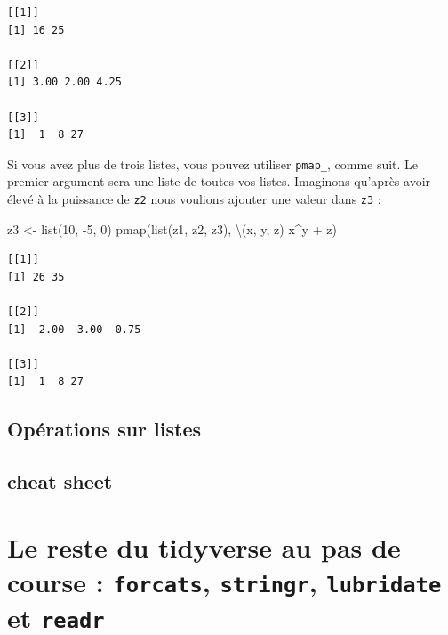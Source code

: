 \documentclass[
  letterpaper,
  DIV=11,
  numbers=noendperiod]{scrreprt}
\newenvironment{Shaded}{\begin{snugshade}}{\end{snugshade}}
\newcommand{\DecValTok}[1]{\textcolor[rgb]{0.68,0.00,0.00}{#1}}
\newcommand{\FunctionTok}[1]{\textcolor[rgb]{0.28,0.35,0.67}{#1}}
\newcommand{\NormalTok}[1]{\textcolor[rgb]{0.00,0.23,0.31}{#1}}
\newcommand{\OtherTok}[1]{\textcolor[rgb]{0.00,0.23,0.31}{#1}}
\newcommand{\SpecialCharTok}[1]{\textcolor[rgb]{0.37,0.37,0.37}{#1}}
\begin{document}
\begin{verbatim}
[[1]]
[1] 16 25

[[2]]
[1] 3.00 2.00 4.25

[[3]]
[1]  1  8 27
\end{verbatim}

Si vous avez plus de trois listes, vous pouvez utiliser \texttt{pmap\_},
comme suit. Le premier argument sera une liste de toutes vos listes.
Imaginons qu'après avoir élevé à la puissance de \texttt{z2} nous
voulions ajouter une valeur dans \texttt{z3} :

\begin{Shaded}
\begin{Highlighting}[]
\NormalTok{z3 }\OtherTok{\textless{}{-}} \FunctionTok{list}\NormalTok{(}\DecValTok{10}\NormalTok{, }\SpecialCharTok{{-}}\DecValTok{5}\NormalTok{, }\DecValTok{0}\NormalTok{)}
\FunctionTok{pmap}\NormalTok{(}\FunctionTok{list}\NormalTok{(z1, z2, z3), \textbackslash{}(x, y, z) x}\SpecialCharTok{\^{}}\NormalTok{y }\SpecialCharTok{+}\NormalTok{ z)}
\end{Highlighting}
\end{Shaded}

\begin{verbatim}
[[1]]
[1] 26 35

[[2]]
[1] -2.00 -3.00 -0.75

[[3]]
[1]  1  8 27
\end{verbatim}

\hypertarget{opuxe9rations-sur-listes}{%
\section{Opérations sur listes}\label{opuxe9rations-sur-listes}}

\hypertarget{cheat-sheet-1}{%
\section{cheat sheet}\label{cheat-sheet-1}}


\hypertarget{le-reste-du-tidyverse-au-pas-de-course-forcats-stringr-lubridate-et-readr}{%
\chapter{\texorpdfstring{Le reste du tidyverse au pas de course :
\texttt{forcats}, \texttt{stringr}, \texttt{lubridate} et
\texttt{readr}}{Le reste du tidyverse au pas de course : forcats, stringr, lubridate et readr}}\label{le-reste-du-tidyverse-au-pas-de-course-forcats-stringr-lubridate-et-readr}}
\end{document}
